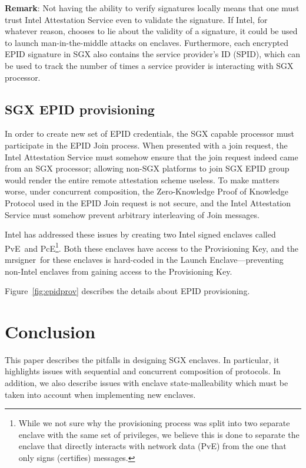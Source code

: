 \documentclass[letterpaper]{article}
\newcommand{\mrsigner}{\textsf{mrsigner}}
\newcommand{\pve}{\textsf{PvE}}
\newcommand{\pce}{\textsf{PcE}}
\newcommand{\launchenclave}{\textsf{Launch Enclave}}
\begin{document}
\begin{description}
      \textbf{Remark}: Not having the ability to verify signatures
      locally means that one must trust Intel Attestation Service even
      to validate the signature. If Intel, for whatever reason,
      chooses to lie about the validity of a signature, it could be
      used to launch man-in-the-middle attacks on
      enclaves. Furthermore, each encrypted EPID signature in SGX also
      contains the service provider's ID (SPID), which can be used to
      track the number of times a service provider is interacting with
      SGX processor. 
  \end{description}


  \subsection{SGX EPID provisioning}
  \label{ssec:epidprov}

  In order to create new set of EPID credentials, the SGX capable
  processor must participate in the EPID Join process. When
  presented with a join request, the Intel Attestation Service must
  somehow ensure that the join request indeed came from an SGX
  processor; allowing non-SGX platforms to join SGX EPID group would
  render the entire remote attestation scheme useless. To make matters
  worse, under concurrent composition, the Zero-Knowledge Proof of
  Knowledge Protocol used in the EPID Join request is not secure, and
  the Intel Attestation Service must somehow prevent arbitrary
  interleaving of Join messages.

  Intel has addressed these issues by creating two Intel signed
  enclaves called \pve\ and \pce\footnote{While we not sure why the
    provisioning process was split into two separate enclave with the
    same set of privileges, we believe this is done to separate the
    enclave that directly interacts with network data (\pve) from the
    one that only signs (certifies) messages.}. Both these enclaves
  have access to the Provisioning Key, and the \mrsigner\ for these
  enclaves is hard-coded in the \launchenclave---preventing non-Intel
  enclaves from gaining access to the Provisioning Key.

  Figure~\ref{fig:epidprov} describes the details about EPID
  provisioning.

\section{Conclusion}
\label{sec:conclusion}
  This paper describes the pitfalls in designing SGX enclaves. In
  particular, it highlights issues with sequential and concurrent
  composition of protocols. In addition, we also describe issues with
  enclave state-malleability which must be taken into account when
  implementing new enclaves.
\end{document}
